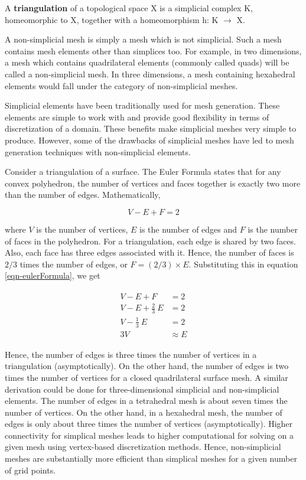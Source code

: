 \begin{definition}
	A \textbf{triangulation} of a topological space X is a simplicial complex K, homeomorphic to X, together with a homeomorphism h: K $\rightarrow$ X.
\end{definition}

A non-simplicial mesh is simply a mesh which is not simplicial. Such a mesh contains mesh elements other than simplices too. For example, in two dimensions, a mesh which contains quadrilateral elements (commonly called quads) will be called a non-simplicial mesh. In three dimensions, a mesh containing hexahedral elements would fall under the category of non-simplicial meshes.

Simplicial elements have been traditionally used for mesh generation. These elements are simple to work with and provide good flexibility in terms of discretization of a domain. These benefits make simplicial meshes very simple to produce. However, some of the drawbacks of simplicial meshes have led to mesh generation techniques with non-simplicial elements.

Consider a triangulation of a surface. The Euler Formula states that for any convex polyhedron, the number of vertices and faces together is exactly two more than the number of edges. Mathematically,

\begin{equation}
V-E+F=2
\label{eqn-eulerFormula}
\end{equation}

where $V$ is the number of vertices, $E$ is the number of edges and $F$ is the number of faces in the polyhedron. For a triangulation, each edge is shared by two faces. Also, each face has three edges associated with it. Hence, the number of faces is $2/3$ times the number of edges, or $F= (2/3) \times E$. Substituting this in equation \ref{eqn-eulerFormula}, we get

\begin{align}
\begin{split}
		V - E + F  & = 2 \\
		V - E + \frac{2}{3} \: E & = 2 \\
		V - \frac{1}{3} \: E & = 2 \\
		3V & \approx E
		\end{split}
\end{align}

Hence, the number of edges is three times the number of vertices in a triangulation (asymptotically). On the other hand, the number of edges is two times the number of vertices for a closed quadrilateral surface mesh. A similar derivation could be done for three-dimensional simplicial and non-simplicial elements. The number of edges in a tetrahedral mesh is about seven times the number of vertices. On the other hand, in a hexahedral mesh, the number of edges is only about three times the number of vertices (asymptotically). Higher connectivity for simplical meshes leads to higher computational for solving on a given mesh using vertex-based discretization methods. Hence, non-simplicial meshes are substantially more efficient than simplical meshes for a given number of grid points.

